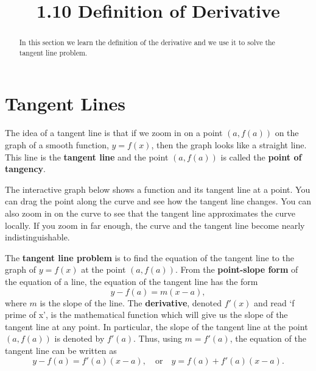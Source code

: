 \documentclass[handout]{ximera}
\title{1.10 Definition of Derivative}
\begin{document}
\begin{abstract}
In this section we learn the definition of the derivative and we use it to solve the tangent line problem.
\end{abstract}

\maketitle


\section{Tangent Lines}










The idea of a tangent line is that if we zoom in on a point $(a, f(a))$ on the graph of a smooth function, $y = f(x)$, 
then the graph looks like a straight line. 
This line is the \textbf{tangent line} and the point $(a, f(a))$ is called the \textbf{point of tangency}.



The interactive graph below shows a function and its tangent line at a point.  
You can drag the point along the curve and see how the tangent line changes.
You can also zoom in on the curve to see that the tangent line approximates the curve
locally.  If you zoom in far enough, the curve and the tangent line become nearly indistinguishable.









The \textbf{tangent line problem} is to find the equation of the tangent line to the graph of $y = f(x)$
at the point $(a, f(a))$. From the \textbf{point-slope form} of the equation of a line,
the equation of the tangent line has the form
\[
y -f(a) = m(x-a),
\]
where $m$ is the slope of the line.  The \textbf{derivative}, denoted $f'(x)$ and read `f prime of x', is the mathematical 
function which will give us the slope of the tangent line at any point.  
In particular, the slope of the tangent line at the point $(a, f(a))$ is denoted by $f'(a)$.
Thus, using $m = f'(a)$, the equation of the tangent line can be written as
\[
y - f(a) = f'(a)(x-a), \quad \text{or} \quad y = f(a) + f'(a)(x-a).
\]
\end{document}

